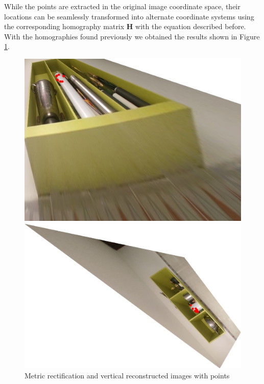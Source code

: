 \documentclass{Academic}
\begin{document}
\noindent While the points are extracted in the original image coordinate space, their locations can be seamlessly transformed into alternate coordinate systems using the corresponding homography matrix $\mathbf{H}$ with the equation described before. 
With the homographies found previously we obtained the results shown in Figure \ref{fig:poi}.
\begin{figure}[!htb]
    \centering
    \begin{minipage}{0.5\linewidth}
        \centering
        \includegraphics[width=\linewidth]{images/points_rec_1.jpg}
    \end{minipage}%
    \begin{minipage}{0.5\linewidth}
        \centering
        \includegraphics[width=\linewidth]{images/points_rec_2.jpg}
    \end{minipage}
    \caption{Metric rectification and vertical reconstructed images with points}
    \label{fig:poi}
\end{figure}
\end{document}
